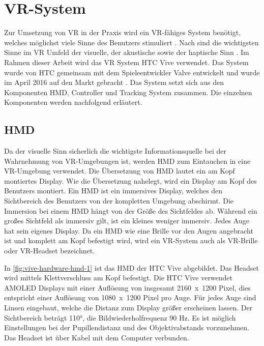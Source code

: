 \section{\acs{VR}-System}
Zur Umsetzung von \ac{VR} in der Praxis wird ein \ac{VR}-fähiges System benötigt, welches möglichst viele Sinne des Benutzers stimuliert \cite{Doerner2019}. Nach \citeauthor{DoernerWahrnehmung} sind die wichtigsten Sinne im \ac{VR} Umfeld der visuelle, der akustische sowie der haptische Sinn \cite{DoernerWahrnehmung}. Im Rahmen dieser Arbeit wird das \acs{VR} System HTC Vive verwendet. Das System wurde von HTC gemeinsam mit dem Spieleentwickler Valve entwickelt und wurde im April 2016 auf den Markt gebracht \cite{Fehrenbach.14.4.2016}. Das System setzt sich aus den Komponenten \ac{HMD}, Controller und Tracking System zusammen. Die einzelnen Komponenten werden nachfolgend erläutert. 

\subsection{\acl{HMD}}
Da der visuelle Sinn \glqq sicherlich die wichtigste Informationsquelle bei der Wahrnehmung\grqq \cite{DoernerWahrnehmung} von \ac{VR}-Umgebungen ist, werden \ac{HMD} zum Eintauchen in eine \ac{VR}-Umgebung verwendet. Die Übersetzung von \ac{HMD} lautet \glqq ein am Kopf montiertes Display\grqq. Wie die Übersetzung nahelegt, wird ein Display am Kopf des Benutzers montiert. Ein \ac{HMD} ist ein immersives Display, welches den Sichtbereich des Benutzers von der kompletten Umgebung abschirmt. Die Immersion bei einem \ac{HMD} hängt von der Größe des Sichtfeldes ab. Während ein großes Sichtfeld als immersiv gilt, ist ein kleines weniger immersiv. \cite{Doerner2019} Jedes Auge hat sein eigenes Display. Da ein \ac{HMD} wie eine Brille vor den Augen angebracht ist und komplett am Kopf befestigt wird, wird ein \ac{VR}-System auch als \ac{VR}-Brille oder \ac{VR}-Headset bezeichnet.

In \autoref{fig:vive-hardware-hmd-1} ist das \ac{HMD} der HTC Vive abgebildet. Das Headset wird mittels Klettverschluss am Kopf befestigt. Die HTC Vive verwendet AMOLED Displays mit einer Auflösung von insgesamt \mbox{2160 x 1200} Pixel, dies entspricht einer Auflösung von \mbox{1080 x 1200} Pixel pro Auge. Für jedes Auge sind Linsen eingebaut, welche die Distanz zum Display größer erscheinen lassen. Der Sichtbereich beträgt 110°, die Bildwiederholfrequenz 90 Hz. Es ist möglich Einstellungen bei der Pupillendistanz und des Objektivabstands vorzunehmen. Das Headset ist über Kabel mit dem Computer verbunden. \cite{ViveProduct}

